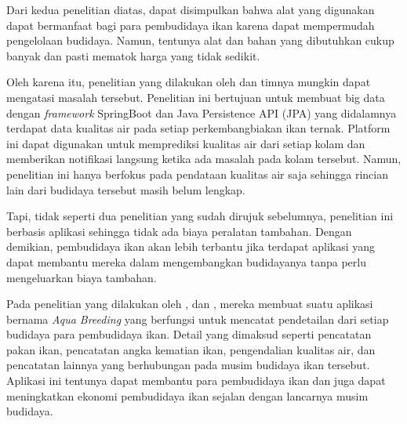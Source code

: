 \begin{spacing}{1.5}
Dari kedua penelitian diatas, dapat disimpulkan bahwa alat yang digunakan dapat bermanfaat bagi para pembudidaya ikan karena dapat mempermudah pengelolaan budidaya. Namun, tentunya alat dan bahan yang dibutuhkan cukup banyak dan pasti mematok harga yang tidak sedikit. 

Oleh karena itu, penelitian yang dilakukan oleh \citep{waterquality} dan timnya mungkin dapat mengatasi masalah tersebut. Penelitian ini bertujuan untuk membuat big data dengan \textit{framework} SpringBoot dan Java Persistence API (JPA) yang didalamnya terdapat data kualitas air pada setiap perkembangbiakan ikan ternak. Platform ini dapat digunakan untuk memprediksi kualitas air dari setiap kolam dan memberikan notifikasi langsung ketika ada masalah pada kolam tersebut. Namun, penelitian ini hanya berfokus pada pendataan kualitas air saja sehingga rincian lain dari budidaya tersebut masih belum lengkap. \citep{waterquality} 

Tapi, tidak seperti dua penelitian yang sudah dirujuk sebelumnya, penelitian \citep{waterquality} ini berbasis aplikasi sehingga tidak ada biaya peralatan tambahan. Dengan demikian, pembudidaya ikan akan lebih terbantu jika terdapat aplikasi yang dapat membantu mereka dalam mengembangkan budidayanya tanpa perlu mengeluarkan biaya tambahan.

Pada penelitian yang dilakukan oleh \citep{fadhil2021}, \citep{gian2022} dan \citep{andri2022}, mereka membuat suatu aplikasi bernama \textit{Aqua Breeding} yang berfungsi untuk mencatat pendetailan dari setiap budidaya para pembudidaya ikan. Detail yang dimaksud seperti pencatatan pakan ikan, pencatatan angka kematian ikan, pengendalian kualitas air, dan pencatatan lainnya yang berhubungan pada musim budidaya ikan tersebut. Aplikasi ini tentunya dapat membantu para pembudidaya ikan dan juga dapat meningkatkan ekonomi pembudidaya ikan sejalan dengan lancarnya musim budidaya.


\end{spacing}
